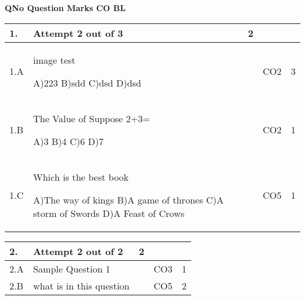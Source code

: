 \documentclass[12pt]{article}
\begin{document}
	\begin{flushleft}
	\bf{QNo}\hspace{1.2cm} \bf{Question} \hspace{5.5cm}  \bf{Marks} \hspace{0.2cm} \bf{CO} \hspace{0.2cm}	\bf{BL}	
	
\end{flushleft} 
	\begin{longtable}{|L{1cm}|L{8cm}|C{1cm}|C{1cm}|C{1cm}|}\hline
		\bf{1}. & \bf{Attempt} \bf2 \bf{out} of \bf3 & \bf2  & & \\ \hline
				1.A & image test \newline
					
		A)223\newline
		B)sdd\newline
		C)dsd\newline
		D)dsd &
		 &
		CO2&
		3 \\ \hline
		
				1.B & The Value of Suppose 2+3= \newline
					
		A)3\newline
		B)4\newline
		C)6\newline
		D)7 &
		 &
		CO2&
		1 \\ \hline
		
				1.C & Which is the best book \newline
					
		A)The way of kings\newline
		B)A game of thrones\newline
		C)A storm of Swords\newline
		D)A Feast of Crows &
		 &
		CO5&
		1 \\ \hline
		
		
	\end{longtable}

	\begin{longtable}{|L{1cm}|L{8cm}|C{1cm}|C{1cm}|C{1cm}|}\hline
	\bf2. & \bf{Attempt} \bf{2} \bf{out of} \bf{2} & \bf{2}  & & \\ \hline





		2.A &
	Sample Question 1 \newline
			
	 &   & CO3 & 1\\ \hline
		2.B &
	what is in this question \newline
			
	 &   & CO5 & 2\\ \hline
	\end{longtable}
\end{document}

